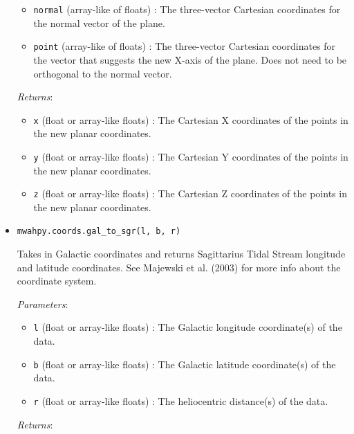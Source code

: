 \documentclass{article}
\begin{document}
\begin{itemize}
\begin{itemize}
\item \verb!normal! (array-like of floats) : The three-vector Cartesian coordinates for the normal vector of the plane.

\item \verb!point! (array-like of floats) : The three-vector Cartesian coordinates for the vector that suggests the new X-axis of the plane. Does not need to be orthogonal to the normal vector.

\end{itemize}

\textit{Returns}: \begin{itemize}

\item \verb!x! (float or array-like floats) : The Cartesian X coordinates of the points in the new planar coordinates.

\item \verb!y! (float or array-like floats) : The Cartesian Y coordinates of the points in the new planar coordinates.

\item \verb!z! (float or array-like floats) : The Cartesian Z coordinates of the points in the new planar coordinates.

\end{itemize}



\item \verb!mwahpy.coords.gal_to_sgr(l, b, r)!

Takes in Galactic coordinates and returns Sagittarius Tidal Stream longitude and latitude coordinates. See Majewski et al. (2003) for more info about the coordinate system. 

\textit{Parameters}: \begin{itemize}

\item \verb!l! (float or array-like floats) : The Galactic longitude coordinate(s) of the data.

\item \verb!b! (float or array-like floats) : The Galactic latitude coordinate(s) of the data.

\item \verb!r! (float or array-like floats) : The heliocentric distance(s) of the data.

\end{itemize}

\textit{Returns}: \begin{itemize}


\end{itemize}
\end{itemize}
\end{document}
